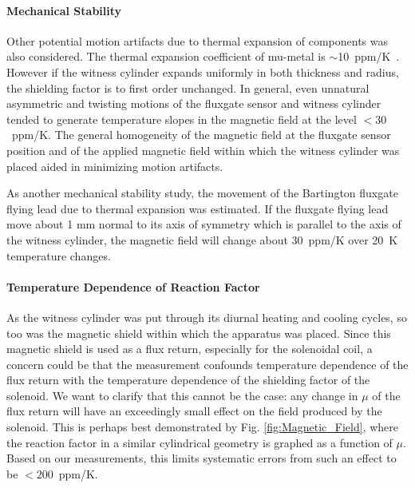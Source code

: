 \paragraph{Mechanical Stability}
Other potential motion artifacts due to thermal expansion of
components was also considered.  The thermal expansion coefficient of
mu-metal is $\sim$10~ppm/K~\cite{kruppvdm}.  However if the witness
cylinder expands uniformly in both thickness and radius, the shielding
factor is to first order unchanged.  In general, even unnatural
asymmetric and twisting motions of the fluxgate sensor and witness
cylinder tended to generate temperature slopes in the magnetic field
at the level $<30$~ppm/K. The general homogeneity of the magnetic
field at the fluxgate sensor position and of the applied magnetic
field within which the witness cylinder was placed aided in minimizing
motion artifacts.


As another mechanical stability study, the movement of the Bartington
fluxgate flying lead due to thermal expansion was estimated. If the
fluxgate flying lead move about 1 mm normal to its axis of symmetry
which is parallel to the axis of the witness cylinder, the magnetic
field will change about 30~ppm/K over 20~K temperature changes.




\paragraph{Temperature Dependence of Reaction Factor}
As the witness cylinder was put through its diurnal heating and
cooling cycles, so too was the magnetic shield within which the
apparatus was placed.  Since this magnetic shield is used as a flux
return, especially for the solenoidal coil, a concern could be that
the measurement confounds temperature dependence of the flux return
with the temperature dependence of the shielding factor of the
solenoid.  We want to clarify that this cannot be the case: any change
in $\mu$ of the flux return will have an exceedingly small effect on
the field produced by the solenoid.  This is perhaps best demonstrated
by Fig. \ref{fig:Magnetic_Field}, where the reaction factor in a
similar cylindrical geometry is graphed as a function of $\mu$. Based
on our measurements, this limits systematic errors from such an effect
to be $<200$~ppm/K.


